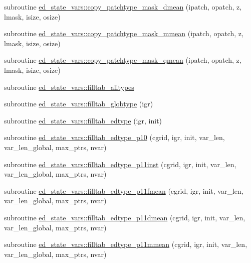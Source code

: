 \begin{DoxyCompactItemize}
\item 
subroutine \hyperlink{namespaceed__state__vars_afdb52860e9dff4bb1917d54009d84d68}{ed\+\_\+state\+\_\+vars\+::copy\+\_\+patchtype\+\_\+mask\+\_\+dmean} (ipatch, opatch, z, lmask, isize, osize)
\item 
subroutine \hyperlink{namespaceed__state__vars_a35a0142a5bd5bfb026012c1e9c38dbf5}{ed\+\_\+state\+\_\+vars\+::copy\+\_\+patchtype\+\_\+mask\+\_\+mmean} (ipatch, opatch, z, lmask, isize, osize)
\item 
subroutine \hyperlink{namespaceed__state__vars_a4fb10d3b10b1c5d40c2c36d89c8121ee}{ed\+\_\+state\+\_\+vars\+::copy\+\_\+patchtype\+\_\+mask\+\_\+qmean} (ipatch, opatch, z, lmask, isize, osize)
\item 
subroutine \hyperlink{namespaceed__state__vars_afdc01451213108f52d4c3ac14a804f74}{ed\+\_\+state\+\_\+vars\+::filltab\+\_\+alltypes}
\item 
subroutine \hyperlink{namespaceed__state__vars_ac479c3704655d44e4b6b87b703c488a1}{ed\+\_\+state\+\_\+vars\+::filltab\+\_\+globtype} (igr)
\item 
subroutine \hyperlink{namespaceed__state__vars_a31b9d7889efe4b92ff8dc064eb655d4e}{ed\+\_\+state\+\_\+vars\+::filltab\+\_\+edtype} (igr, init)
\item 
subroutine \hyperlink{namespaceed__state__vars_abb260c56b27f849e311a4ff12439a2d6}{ed\+\_\+state\+\_\+vars\+::filltab\+\_\+edtype\+\_\+p10} (cgrid, igr, init, var\+\_\+len, var\+\_\+len\+\_\+global, max\+\_\+ptrs, nvar)
\item 
subroutine \hyperlink{namespaceed__state__vars_a256581db31438ac1eab6658d8eed7e6d}{ed\+\_\+state\+\_\+vars\+::filltab\+\_\+edtype\+\_\+p11inst} (cgrid, igr, init, var\+\_\+len, var\+\_\+len\+\_\+global, max\+\_\+ptrs, nvar)
\item 
subroutine \hyperlink{namespaceed__state__vars_a6d7159b5099487f658877739e29f3f40}{ed\+\_\+state\+\_\+vars\+::filltab\+\_\+edtype\+\_\+p11fmean} (cgrid, igr, init, var\+\_\+len, var\+\_\+len\+\_\+global, max\+\_\+ptrs, nvar)
\item 
subroutine \hyperlink{namespaceed__state__vars_a7ed69aec83eaa248927d38ddd7a67daa}{ed\+\_\+state\+\_\+vars\+::filltab\+\_\+edtype\+\_\+p11dmean} (cgrid, igr, init, var\+\_\+len, var\+\_\+len\+\_\+global, max\+\_\+ptrs, nvar)
\item 
subroutine \hyperlink{namespaceed__state__vars_a714397c35a6eb326065670c98745d2ee}{ed\+\_\+state\+\_\+vars\+::filltab\+\_\+edtype\+\_\+p11mmean} (cgrid, igr, init, var\+\_\+len, var\+\_\+len\+\_\+global, max\+\_\+ptrs, nvar)

\end{DoxyCompactItemize}
